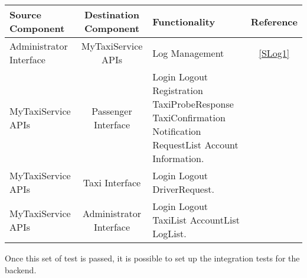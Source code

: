 \documentclass[11pt, a4paper,titlepage]{article}
\begin{document}
	\begin{tabularx}{\textwidth}{| X |c |X |c|}
		\hline \textbf{Source Component} &\textbf{ Destination Component}&\textbf{Functionality} & \textbf{Reference} \\
		\hline Administrator Interface & MyTaxiService APIs & Log Management & \ref{SLog1} \\
		\hline MyTaxiService APIs & Passenger Interface & 
		Login\newline
		Logout\newline
		Registration\newline
		TaxiProbeResponse\newline
		TaxiConfirmation\newline
		Notification\newline
		RequestList\newline
		Account Information.
		&\\
		\hline MyTaxiService APIs & Taxi Interface & 
		Login\newline
		Logout\newline
		DriverRequest.		
		&\\
		\hline MyTaxiService APIs & Administrator Interface & 
		Login\newline
		Logout\newline
		TaxiList\newline
		AccountList\newline
		LogList.
		&\\
		\hline
	\end{tabularx}
	\newline
	\newline
	Once this set of test is passed, it is possible to set up the integration tests for the backend.
	\newline
	\newpage
\end{document}
